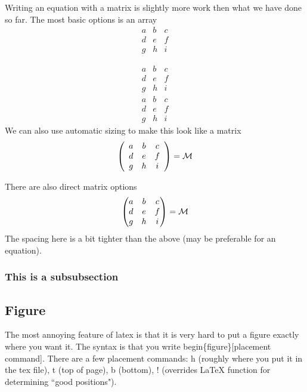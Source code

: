 \documentclass[11pt]{article}
\numberwithin{equation}{section}
\def\beq{\begin{equation}}
\def\eeq{\end{equation}}
\begin{document}
Writing an equation with a matrix is slightly more work then what we have done so far. The most basic options is an array
\beq
\begin{array}{ccc}
a & b & c \\
d & e & f \\
g & h & i \end{array}
\eeq

\beq
\begin{array}{||c|c|c||}
a & b & c \\
d & e & f \\
g & h & i \end{array}
\eeq
\beq
\begin{array}{||c|c|c||}
a & b & c \\
\hline
d & e & f \\
g & h & i \end{array}
\eeq
We can also use automatic sizing to make this look like a matrix
\beq
\left(\begin{array}{ccc}
a & b & c \\
d & e & f \\
g & h & i \end{array}\right) = {\cal M}
\eeq

There are also direct matrix options 
\beq
\begin{pmatrix}
a & b & c \\
d & e & f \\
g & h & i \end{pmatrix} ={\cal M}
\eeq
The spacing here is a bit tighter than the above (may be preferable for an equation).

\subsubsection{This is a subsubsection}

\subsection{Figure}

The most annoying feature of latex is that it is very hard to put a figure exactly where you want it. The syntax is that you write begin\{figure\}[placement command].  There are a few placement commands: h (roughly where you put it in the tex file), t (top of page), b (bottom), ! (overrides LaTeX function for determining ``good positions").
\end{document}
